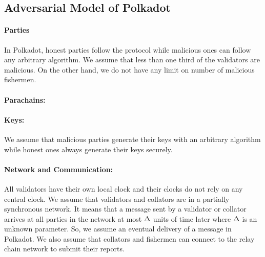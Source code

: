 \subsection{Adversarial Model of Polkadot}

\paragraph{Parties} In Polkadot, honest parties follow the protocol while malicious ones can follow any arbitrary algorithm. We assume that less than one third of the validators are malicious. On the other hand, we do not have any limit on number of malicious fishermen.

\paragraph{Parachains:} %

\paragraph{Keys:} We assume that malicious parties generate their keys with an arbitrary algorithm
while honest ones always generate their keys securely. 

\paragraph{Network and Communication:} All validators have their own local clock and their clocks do not rely on any central clock.
We assume that  validators and collators are in a partially synchronous network.
It means that a message sent by a validator or collator arrives at all parties in the network
at most $\Delta$ units of time later where $\Delta$ is an unknown parameter. So, we assume an eventual delivery of a message in Polkadot.
We also assume that collators and fishermen can connect to the relay chain network to submit their reports.
